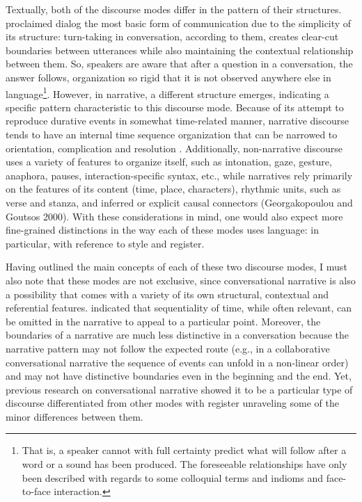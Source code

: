 \documentclass[12pt, draft]{article}
\begin{document}
Textually, both of the discourse modes differ in the pattern of their structures. \textcite{bakhtin1986} proclaimed dialog the most basic form of communication due to the simplicity of its structure: turn-taking in conversation, according to them, creates clear-cut boundaries between utterances while also maintaining the contextual relationship between them. So, speakers are aware that after a question in a conversation, the answer follows, organization so rigid that it is not observed anywhere else in language\footnote{That is, a speaker cannot with full certainty predict what will follow after a word or a sound has been produced. The foreseeable relationships have only been described with regards to some colloquial terms and indioms and face-to-face interaction.}. However, in  narrative, a different structure emerges, indicating a specific pattern characteristic to this discourse mode. Because of its attempt to reproduce durative events in somewhat time-related manner, narrative discourse tends to have an internal time sequence organization that can be narrowed to orientation, complication and resolution \parencite{labov1967}. Additionally, non-narrative discourse uses a variety of features to organize itself, such as intonation, gaze, gesture, anaphora, pauses, interaction-specific syntax, etc., while narratives rely primarily on the features of its content (time, place, characters), rhythmic units, such as verse and stanza, and inferred or explicit causal connectors (Georgakopoulou and Goutsos 2000). With these considerations in mind, one would also expect more fine-grained distinctions in the way each of these modes uses language: in particular, with reference to style and register. 

Having outlined the main concepts of each of these two discourse modes, I must also note that these modes are not exclusive, since conversational narrative is also a possibility that comes with a variety of its own structural, contextual and referential features. \textcite{norrick2000} indicated that sequentiality of time, while often relevant, can be omitted in the narrative to appeal to a particular point. Moreover, the boundaries of a narrative are much less distinctive in a conversation because the narrative pattern may not follow the expected route (e.g., in a collaborative conversational narrative the sequence of events can unfold in a non-linear order) and may not have distinctive boundaries even in the beginning and the end. Yet, previous research on conversational narrative showed it to be a particular type of discourse differentiated from other modes with register unraveling some of the minor differences between them.
\end{document}
